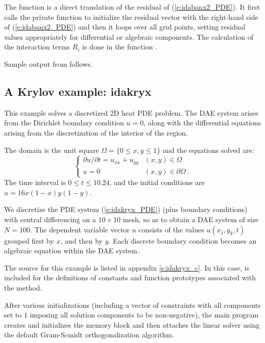 The function  is a direct translation of the residual of
(\ref{e:idabanx2_PDE}).  It first calls the private function  to
initialize the residual vector with the right-hand side of (\ref{e:idabanx2_PDE})
and then it loops over all grid points, setting residual values appropriately for 
differential or algebraic components. The calculation of the interaction terms
$R_i$ is done in the function .


Sample output from  follows.


\subsection{A Krylov example: idakryx}\label{ss:idakryx}

This example solves a discretized 2D heat PDE problem. The DAE system
arises from the Dirichlet boundary condition $u = 0$, along with the 
differential equations arising from the discretization of the interior 
of the region. 

The domain is the unit square $\Omega = \{ 0 \le x,y \le 1 \}$ and the
equations solved are:
\begin{equation}\label{e:idakryx_PDE}
\begin{cases}
  \partial u / \partial t = u_{xx} + u_{yy}  & (x,y) \in \Omega \\
  u = 0 & (x,y) \in \partial\Omega\, .
\end{cases}
\end{equation}
The time interval is $0 \leq t \leq 10.24$, and the initial conditions are 
$u = 16x(1-x)y(1-y)$.

We discretize the PDE system (\ref{e:idakryx_PDE}) (plus boundary conditions)
with central differencing on a $10 \times 10$ mesh, so as to obtain a
DAE system of size $N = 100$.  The dependent variable vector $u$
consists of the values $u(x_j,y_k,t)$ grouped first by $x$, and then
by $y$.  Each discrete boundary condition becomes an algebraic equation
within the DAE system.

The source for this example is listed in appendix \ref{s:idakryx_c}.
In this case,  is included for the definitions of
constants and function prototypes associated with the {\spgmr} method.

After various initializations (including a vector of constraints with
all components set to $1$ imposing all solution components to be
non-negative), the main program creates and initializes the {\ida}
memory block and then attaches the {\idaspgmr} linear solver using the
default  Gram-Scmidt orthogonalization algorithm.

